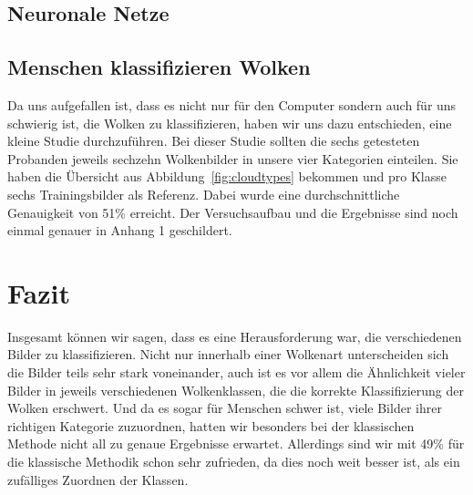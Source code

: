 \documentclass[a4,german]{article}
\begin{document}
\subsection{Neuronale Netze}


\subsection{Menschen klassifizieren Wolken}

Da uns aufgefallen ist, dass es nicht nur für den Computer sondern auch für uns schwierig ist, die Wolken zu klassifizieren, haben wir uns dazu entschieden, eine kleine Studie durchzuführen.
Bei dieser Studie sollten die sechs getesteten Probanden jeweils sechzehn Wolkenbilder in unsere vier Kategorien einteilen.
Sie haben die Übersicht aus Abbildung~\ref{fig:cloudtypes} bekommen und pro Klasse sechs Trainingsbilder als Referenz.
Dabei wurde eine durchschnittliche Genauigkeit von 51\% erreicht. Der Versuchsaufbau und die Ergebnisse sind noch einmal genauer in Anhang 1 %
geschildert.


\section{Fazit}
\label{sec:fazit}


Insgesamt können wir sagen, dass es eine Herausforderung war, die verschiedenen Bilder zu klassifizieren.
Nicht nur innerhalb einer Wolkenart unterscheiden sich die Bilder teils sehr stark voneinander, auch ist es vor allem die Ähnlichkeit vieler Bilder in jeweils verschiedenen Wolkenklassen, die die korrekte Klassifizierung der Wolken erschwert.
Und da es sogar für Menschen schwer ist, viele Bilder ihrer richtigen Kategorie zuzuordnen, hatten wir besonders bei der klassischen Methode nicht all zu genaue Ergebnisse erwartet.
Allerdings sind wir mit 49\% für die klassische Methodik schon sehr zufrieden, da dies noch weit besser ist, als ein zufälliges Zuordnen der Klassen.
\end{document}
